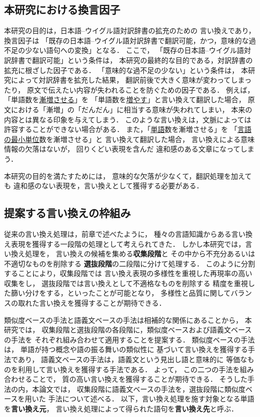 \subsection{本研究における換言因子}
本研究の目的は，日本語--ウイグル語対訳辞書の拡充のための
言い換えであり，
換言因子は
「既存の日本語--ウイグル語対訳辞書で翻訳可能，かつ，意味的な過不足の少ない語句への変換」となる．
ここで，
「既存の日本語--ウイグル語対訳辞書で翻訳可能」という条件は，
本研究の最終的な目的である，対訳辞書の拡充に根ざした因子である．
「意味的な過不足の少ない」という条件は，
本研究によって対訳辞書を拡充した結果，
翻訳前後で大きく意味が変わってしまったり，
原文で伝えたい内容が失われることを防ぐための因子である．
例えば，「単語数を\underline{漸増させる}」を
「単語数を\underline{増やす}」と言い換えて翻訳した場合，
原文における「漸増」の「だんだん」に相当する意味が失われてしまい，
本来の内容とは異なる印象を与えてしまう．
このような言い換えは，文脈によっては許容することができない場合がある．
また，「\underline{単語}数を漸増させる」を
「\underline{言語の最小単位}数を漸増させる」と
言い換えて翻訳した場合，
言い換えによる意味情報の欠落はないが，
回りくどい表現を含んだ
違和感のある文章になってしまう．

本研究の目的を満たすためには，
意味的な欠落が少なくて，翻訳処理を加えても
違和感のない表現を，言い換えとして獲得する必要がある．

\subsection{提案する言い換えの枠組み}
従来の言い換え処理は，前章で述べたように，
種々の言語知識からある言い換え表現を獲得する一段階の処理として考えられてきた．
しかし本研究では，言い換え処理を，
言い換えの候補を集める{\bf 収集段階}と
その中から不充分あるいは不適切なものを削除する
{\bf 選抜段階}の二段階に分けて処理する．
このように分割することにより，収集段階では
言い換え表現の多様性を重視した再現率の高い収集をし，
選抜段階では言い換えとして不適格なものを削除する
精度を重視した篩い分けをする，といったことが可能となり，
多様性と品質に関してバランスの取れた言い換えを獲得することが期待できる．

類似度ベースの手法と語義文ベースの手法は相補的な関係にあることから，
本研究では，
収集段階と選抜段階の各段階に，類似度ベースおよび語義文ベースの手法を
それぞれ組み合わせて適用することを提案する．
類似度ベースの手法は，
単語が持つ概念や語の振る舞いの類似性に
基づいて言い換えを獲得する手法であり，
語義文ベースの手法は，語義文という見出し語と意味的に
等価なものを利用して言い換えを獲得する手法である．
よって，
この二つの手法を組み合わせることで，
質の高い言い換えを獲得することが期待できる．
そうした手法の内，本論文では，
収集段階に語義文ベースの手法を，選抜段階に類似度ベースを用いた
手法について述べる．
以下，言い換え処理を施す対象となる単語を{\bf 言い換え元}，
言い換え処理によって得られた語句を{\bf 言い換え先}と呼ぶ．

